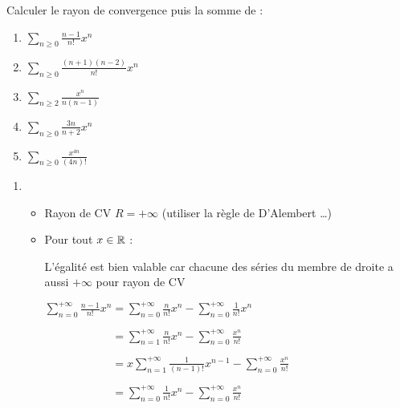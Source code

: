 \documentclass{book}
\begin{document}
\begin{Exercice}
Calculer le rayon de convergence  puis la somme de :
\label{exo:2}
  	\begin{enumerate}
    \item $ \sum\limits_{n \geqslant 0} {\frac{{n - 1}}{{n!}}x^n } $
     
    \item $ \sum\limits_{n \geqslant 0} {\frac{{(n + 1)(n - 2)}}{{n!}}x^n } $

	\item $ \sum\limits_{n \geqslant 2} {\frac{{x^n }}{{n(n - 1)}}} $
	
	\item $ \sum\limits_{n \geqslant 0} \frac{3n }{n+2} x^n$
	
	\item $ \sum\limits_{n \geqslant 0} \frac{x^{4n} }{ (4n)! } $	
  \end{enumerate} 
\begin{Correction}
  	\begin{enumerate}
    \item %
    \begin{itemize}
    	\item Rayon de CV $R = + \infty$ (utiliser la règle de D'Alembert \dots)
    	
    	\item Pour tout $x \in \mathbb{R}$ :

L'égalité est bien valable car chacune des séries du membre de droite a aussi $+ \infty$ pour rayon de CV 
    	
\hspace{0.7cm} $ \sum\limits_{n = 0}^{ + \infty } \frac{n - 1}{n!}x^n =  
\sum\limits_{n = 0}^{ + \infty } {\frac{{n}}{{n!}}x^n }  - \sum\limits_{n = 0}^{ + \infty } {\frac{{1}}{{n!}}x^n } $
    	
\hspace{0.7cm} $\phantom{ \sum\limits_{n = 0}^{ + \infty } \frac{n - 1}{n!}x^n  } =  
\sum\limits_{n = 1}^{ + \infty } \frac{{n}}{{n!}}x^n  - \sum\limits_{n = 0}^{ + \infty } \frac{x^n}{n!}  $

\hspace{0.7cm} $\phantom{ \sum\limits_{n = 0}^{ + \infty } \frac{n - 1}{n!}x^n  } = 
x \sum\limits_{n = 1}^{ + \infty } \frac{1}{ (n-1)! }x^{n-1}  - \sum\limits_{n = 0}^{ + \infty } \frac{x^n}{n!}  $

\hspace{0.7cm} $\phantom{ \sum\limits_{n = 0}^{ + \infty } \frac{n - 1}{n!}x^n  } = 
\sum\limits_{n = 0}^{ + \infty } \frac{1}{ n! }x^{n}  - \sum\limits_{n = 0}^{ + \infty } \frac{x^n}{n!}  $


\end{itemize}
\end{enumerate}
\end{Correction}
\end{Exercice}
\end{document}
